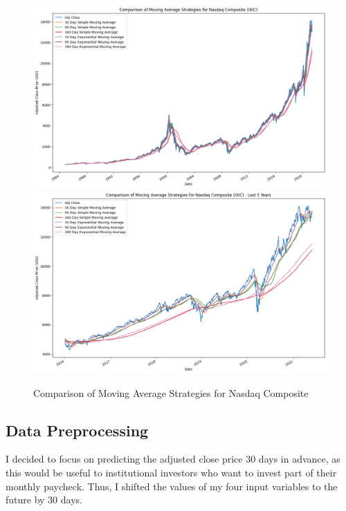 \documentclass[a4paper, 11pt]{article}
\begin{document}
\begin{figure}[H]
    \begin{center}
        \includegraphics[width=1\textwidth]{Comparison of Moving Average Strategies for Nasdaq Composite.png}
        \includegraphics[width=1\textwidth]{Comparison of Moving Average Strategies for Nasdaq Composite (Last 5 Years).png}
        \caption{Comparison of Moving Average Strategies for Nasdaq Composite}
    \end{center}
\end{figure}

\subsection{Data Preprocessing}
I decided to focus on predicting the adjusted close price 30 days in advance, as this would be useful to institutional investors who want to invest part of their monthly paycheck. Thus, I shifted the values of my four input variables to the future by 30 days.
\end{document}
